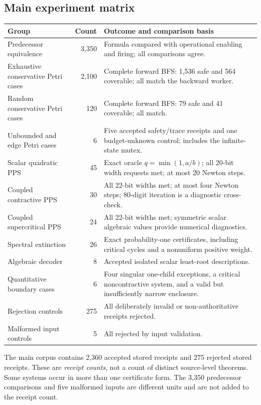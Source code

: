 \subsection{Main experiment matrix}
\begin{longtable}{P{0.29\textwidth}r P{0.47\textwidth}}
\toprule
Group & Count & Outcome and comparison basis \\
\midrule
Predecessor equivalence & 3,350 & Formula compared with operational enabling and firing; all comparisons agree.\\[4pt]
Exhaustive conservative Petri cases & 2,100 & Complete forward BFS: 1,536 safe and 564 coverable; all match the backward worker.\\[4pt]
Random conservative Petri cases & 120 & Complete forward BFS: 79 safe and 41 coverable; all match.\\[4pt]
Unbounded and edge Petri cases & 6 & Five accepted safety/trace receipts and one budget-unknown control; includes the infinite-state mutex.\\[4pt]
Scalar quadratic PPS & 45 & Exact oracle $q=\min(1,a/b)$; all 20-bit width requests met; at most 20 Newton steps.\\[4pt]
Coupled contractive PPS & 30 & All 22-bit widths met; at most four Newton steps; 80-digit iteration is a diagnostic cross-check.\\[4pt]
Coupled supercritical PPS & 24 & All 22-bit widths met; symmetric scalar algebraic values provide numerical diagnostics.\\[4pt]
Spectral extinction & 26 & Exact probability-one certificates, including critical cycles and a nonuniform positive weight.\\[4pt]
Algebraic decoder & 8 & Accepted isolated scalar least-root descriptions.\\[4pt]
Quantitative boundary cases & 6 & Four singular one-child exceptions, a critical noncontractive system, and a valid but insufficiently narrow enclosure.\\[4pt]
Rejection controls & 275 & All deliberately invalid or non-authoritative receipts rejected.\\[4pt]
Malformed input controls & 5 & All rejected by input validation.\\
\bottomrule
\end{longtable}

The main corpus contains 2,360 accepted stored receipts and 275 rejected stored receipts. These are \emph{receipt counts}, not a count of distinct source-level theorems. Some systems occur in more than one certificate form. The 3,350 predecessor comparisons and five malformed inputs are different units and are not added to the receipt count.

